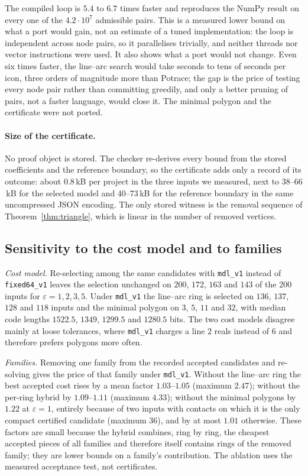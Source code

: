 \documentclass[11pt,a4paper]{article}
\theoremstyle{definition}
\theoremstyle{remark}
\begin{document}
The compiled loop is $5.4$ to $6.7$ times faster and reproduces the NumPy
result on every one of the $4.2\cdot10^{7}$ admissible pairs. This is a
measured lower bound on what a port would gain, not an estimate of a tuned
implementation: the loop is independent across node pairs, so it
parallelises trivially, and neither threads nor vector instructions were
used. It also shows what a port would not change. Even six times faster, the
line--arc search would take seconds to tens of seconds per icon, three orders
of magnitude more than Potrace; the gap is the price of testing every node
pair rather than committing greedily, and only a better pruning of pairs, not
a faster language, would close it. The minimal polygon and the certificate
were not ported.

\paragraph{Size of the certificate.} No proof object is stored. The checker
re-derives every bound from the stored coefficients and the reference
boundary, so the certificate adds only a record of its outcome: about
$0.8$\,kB per project in the three inputs we measured, next to $38$--$66$\,kB
for the selected model and $40$--$73$\,kB for the reference boundary in the
same uncompressed JSON encoding. The only stored witness is the removal
sequence of Theorem~\ref{thm:triangle}, which is linear in the number of
removed vertices.

\subsection{Sensitivity to the cost model and to families}\label{sec:costablation}

\emph{Cost model.} Re-selecting among the same candidates with
\texttt{mdl\_v1} instead of \texttt{fixed64\_v1} leaves the selection
unchanged on $200$, $172$, $163$ and $143$ of the 200 inputs for
$\varepsilon=1,2,3,5$. Under \texttt{mdl\_v1} the line--arc ring is selected
on $136$, $137$, $128$ and $118$ inputs and the minimal polygon on $3$, $5$,
$11$ and $32$, with median code lengths $1522.5$, $1349$, $1299.5$ and
$1280.5$ bits. The two cost models disagree mainly at loose tolerances, where
\texttt{mdl\_v1} charges a line $2$ reals instead of $6$ and therefore
prefers polygons more often.

\emph{Families.} Removing one family from the recorded accepted candidates and
re-solving gives the price of that family under \texttt{mdl\_v1}. Without the
line--arc ring the best accepted cost rises by a mean factor
$1.03$--$1.05$ (maximum $2.47$); without the per-ring hybrid by
$1.09$--$1.11$ (maximum $4.33$); without the minimal polygons by $1.22$ at
$\varepsilon=1$, entirely because of two inputs with contacts on which it is
the only compact certified candidate (maximum $36$), and by at most $1.01$
otherwise. These factors are small because the hybrid combines, ring by
ring, the cheapest accepted pieces of all families and therefore itself
contains rings of the removed family; they are lower bounds on a family's
contribution. The ablation uses the measured acceptance test, not
certificates.
\end{document}
